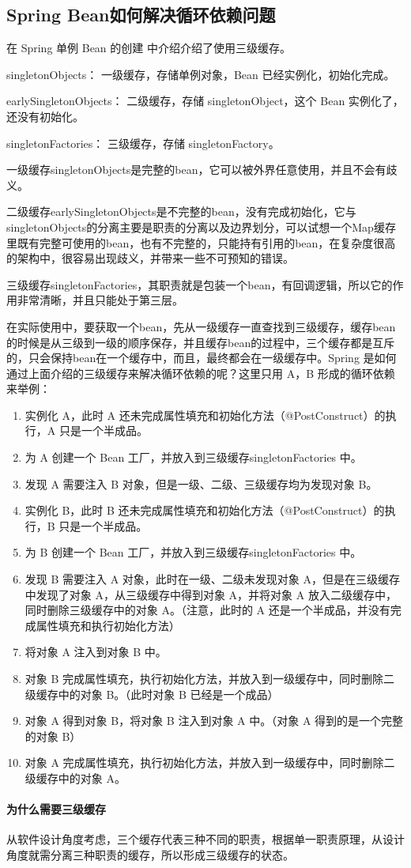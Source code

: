 \documentclass[../../../interview-questions.tex]{subfiles}
\begin{document}
\subsection{Spring Bean如何解决循环依赖问题}

在 Spring 单例 Bean 的创建 中介绍介绍了使用三级缓存。

singletonObjects： 一级缓存，存储单例对象，Bean 已经实例化，初始化完成。

earlySingletonObjects： 二级缓存，存储 singletonObject，这个 Bean 实例化了，还没有初始化。

singletonFactories： 三级缓存，存储 singletonFactory。


一级缓存singletonObjects是完整的bean，它可以被外界任意使用，并且不会有歧义。

二级缓存earlySingletonObjects是不完整的bean，没有完成初始化，它与singletonObjects的分离主要是职责的分离以及边界划分，可以试想一个Map缓存里既有完整可使用的bean，也有不完整的，只能持有引用的bean，在复杂度很高的架构中，很容易出现歧义，并带来一些不可预知的错误。

三级缓存singletonFactories，其职责就是包装一个bean，有回调逻辑，所以它的作用非常清晰，并且只能处于第三层。

在实际使用中，要获取一个bean，先从一级缓存一直查找到三级缓存，缓存bean的时候是从三级到一级的顺序保存，并且缓存bean的过程中，三个缓存都是互斥的，只会保持bean在一个缓存中，而且，最终都会在一级缓存中。Spring 是如何通过上面介绍的三级缓存来解决循环依赖的呢？这里只用 A，B 形成的循环依赖来举例：

\begin{enumerate}
    \item {实例化 A，此时 A 还未完成属性填充和初始化方法（@PostConstruct）的执行，A 只是一个半成品。}
    \item {为 A 创建一个 Bean 工厂，并放入到三级缓存singletonFactories 中。}
    \item {发现 A 需要注入 B 对象，但是一级、二级、三级缓存均为发现对象 B。}
    \item {实例化 B，此时 B 还未完成属性填充和初始化方法（@PostConstruct）的执行，B 只是一个半成品。}
    \item {为 B 创建一个 Bean 工厂，并放入到三级缓存singletonFactories 中。}
    \item {发现 B 需要注入 A 对象，此时在一级、二级未发现对象 A，但是在三级缓存中发现了对象 A，从三级缓存中得到对象 A，并将对象 A 放入二级缓存中，同时删除三级缓存中的对象 A。（注意，此时的 A 还是一个半成品，并没有完成属性填充和执行初始化方法）}
    \item {将对象 A 注入到对象 B 中。}
    \item {对象 B 完成属性填充，执行初始化方法，并放入到一级缓存中，同时删除二级缓存中的对象 B。（此时对象 B 已经是一个成品）}
    \item {对象 A 得到对象 B，将对象 B 注入到对象 A 中。（对象 A 得到的是一个完整的对象 B）}
    \item {对象 A 完成属性填充，执行初始化方法，并放入到一级缓存中，同时删除二级缓存中的对象 A。}
\end{enumerate}

\paragraph{为什么需要三级缓存}

从软件设计角度考虑，三个缓存代表三种不同的职责，根据单一职责原理，从设计角度就需分离三种职责的缓存，所以形成三级缓存的状态。
\end{document}
